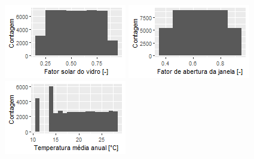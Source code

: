 \documentclass{article}
\begin{document}
\begin{figure}[h!]
\begin{minipage}{.33\textwidth}
	\end{minipage}
	\centering
	\begin{minipage}{.33\textwidth}
		\centering
		\includegraphics[width=\linewidth]{plot_shgc.png}
	\end{minipage}%
	\begin{minipage}{.33\textwidth}
		\centering
		\includegraphics[width=\linewidth]{plot_open_fac.png}
	\end{minipage}%
	\begin{minipage}{.33\textwidth}
		\centering
		\includegraphics[width=\linewidth]{plot_DBT.png}

\end{minipage}
\end{figure}
\end{document}

